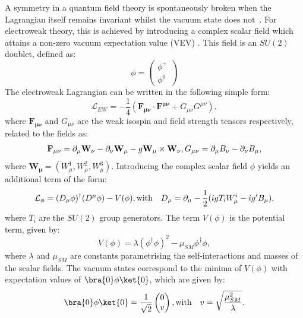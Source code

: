 A symmetry in a quantum field theory is spontaneously broken when the Lagrangian
itself remains invariant whilst the vacuum state does
not~\cite{AitchisonGaugeTheories}. For electroweak
theory, this is achieved by introducing a complex scalar field which attains a
non-zero vacuum expectation value (VEV)
\cite{Higgs:1964ia,Higgs:1964pj,Guralnik:1964eu,Higgs:1966ev,Kibble:1967sv}. 
This field is an $SU(2)$ doublet, defined as:
\begin{equation}
\phi = \begin{pmatrix}\phi^{+} \\ \phi^{0} \end{pmatrix}
\end{equation}
The electroweak Lagrangian can be written in the following simple form:
\begin{equation}
\mathcal{L}_{EW} = -\frac{1}{4}(\mathbf{F_{\mu\nu}}\cdot\mathbf{F^{\mu\nu}} +
G_{\mu\nu}G^{\mu\nu}), 
\end{equation}
where $\mathbf{F_{\mu\nu}}$ and $G_{\mu\nu}$ are the weak isospin and field strength
tensors respectively, related to the fields as:
\begin{equation}
\mathbf{F_{\mu\nu}} = \partial_{\mu} \mathbf{W_{\nu}} - \partial_{\nu}\mathbf{W_{\mu}} -
g\mathbf{W_{\mu}} \times \mathbf{W_{\nu}} ,\\ 
G_{\mu\nu} = \partial_{\mu} B_{\nu} - \partial_{\nu}B_{\mu} ,
\end{equation}
where $\mathbf{W_{\mu}}= (W_{\mu}^{1},W_{\mu}^{2},W_{\mu}^{3})$. Introducing the
complex scalar field $\phi$ yields an additional term of the form:
\begin{equation}
\mathcal{L_{\phi}} = (D_{\mu}\phi)^{\dagger}(D^{\mu}\phi) - V(\phi), \\ 
\text{with} \quad D_{\mu} = \partial_{\mu} - \frac{1}{2}(igT_{i}W_{\mu}^{i} - ig'B_{\mu}),
\end{equation}
where $T_{i}$ are the $SU(2)$ group generators. The term $V(\phi)$ is the
potential term, given by:
\begin{equation}
V(\phi) = \lambda(\phi^{\dagger}\phi)^{2} - \mu_{SM}\phi^{\dagger}\phi,
\end{equation}
where $\lambda$ and $\mu_{SM}$ are constants parametrising the self-interactions
and masses of the scalar fields. The vacuum states correspond to the minima of
$V(\phi)$ with expectation values of $\bra{0}\phi\ket{0}$, which are given by:
\begin{equation}
\bra{0}\phi\ket{0} = \frac{1}{\sqrt{2}} \begin{pmatrix}0 \\ v \end{pmatrix}, \\
\text{with} \quad v=\sqrt{\frac{\mu_{SM}^{2}}{\lambda}}.
\end{equation}

